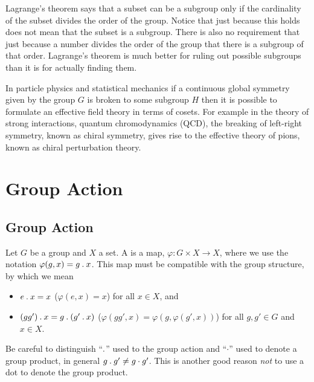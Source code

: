 Lagrange's theorem says that a subset can be a subgroup only if the cardinality of the subset divides the order of the group.
Notice that just because this holds does not mean that the subset is a subgroup.
There is also no requirement that just because a number divides the order of the group that there is a subgroup of that order.
Lagrange's theorem is much better for ruling out possible subgroups than it is for actually finding them.

\begin{app}{}{}
    In particle physics and statistical mechanics if a continuous global symmetry given by the group \(G\) is broken to some subgroup \(H\) then it is possible to formulate an effective field theory in terms of cosets.
    For example in the theory of strong interactions, quantum chromodynamics (QCD), the breaking of left-right symmetry, known as chiral symmetry, gives rise to the effective theory of pions, known as chiral perturbation theory.
\end{app}

\chapter{Group Action}
\section{Group Action}
\begin{dfn}{}{}
    Let \(G\) be a group and \(X\) a set.
    A  is a map, \(\varphi\colon G \times X \to X\), where we use the notation \(\varphi(g, x) = g\mathbin{.} x\).
    This map must be compatible with the group structure, by which we mean
    \begin{itemize}
        \item \(e\mathbin{.} x = x\) (\(\varphi(e, x) = x\)) for all \(x \in X\), and
        \item \((gg')\mathbin{.} x = g\mathbin{.}(g'\mathbin{.} x)\) (\(\varphi(gg', x) = \varphi(g, \varphi(g', x))\)) for all \(g, g' \in G\) and \(x \in X\).
    \end{itemize}
\end{dfn}

\begin{wrn}
    Be careful to distinguish \enquote{\(\mathbin{.}\)} used to the group action and \enquote{\(\cdot\)} used to denote a group product, in general \(g\mathbin{.} g' \ne g\cdot g'\).
    This is another good reason \emph{not} to use a dot to denote the group product.
\end{wrn}

